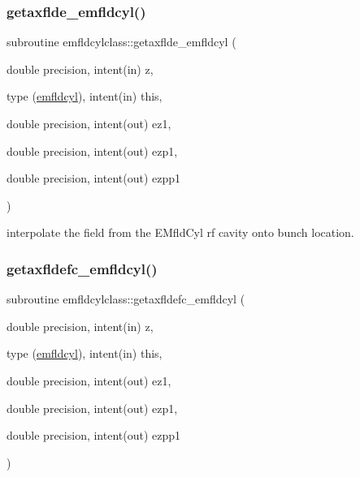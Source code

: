 \mbox{\label{namespaceemfldcylclass_ad20d4f71c528ba16303a936f78d0c44e}} 
\subsubsection{\texorpdfstring{getaxflde\_emfldcyl()}{getaxflde\_emfldcyl()}}
{\footnotesize\ttfamily subroutine emfldcylclass\+::getaxflde\+\_\+emfldcyl (\begin{DoxyParamCaption}\item[{double precision, intent(in)}]{z,  }\item[{type (\mbox{\hyperlink{namespaceemfldcylclass_structemfldcylclass_1_1emfldcyl}{emfldcyl}}), intent(in)}]{this,  }\item[{double precision, intent(out)}]{ez1,  }\item[{double precision, intent(out)}]{ezp1,  }\item[{double precision, intent(out)}]{ezpp1 }\end{DoxyParamCaption})}



interpolate the field from the E\+Mfld\+Cyl rf cavity onto bunch location. 

\mbox{\label{namespaceemfldcylclass_a6e60352b9a6d8b289d85b9ddcc2b9336}} 
\subsubsection{\texorpdfstring{getaxfldefc\_emfldcyl()}{getaxfldefc\_emfldcyl()}}
{\footnotesize\ttfamily subroutine emfldcylclass\+::getaxfldefc\+\_\+emfldcyl (\begin{DoxyParamCaption}\item[{double precision, intent(in)}]{z,  }\item[{type (\mbox{\hyperlink{namespaceemfldcylclass_structemfldcylclass_1_1emfldcyl}{emfldcyl}}), intent(in)}]{this,  }\item[{double precision, intent(out)}]{ez1,  }\item[{double precision, intent(out)}]{ezp1,  }\item[{double precision, intent(out)}]{ezpp1 }\end{DoxyParamCaption})}



